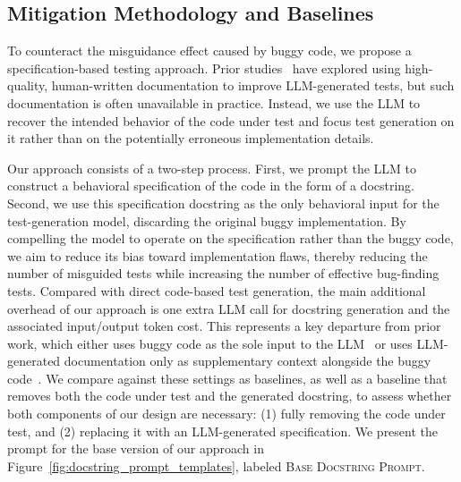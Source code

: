 \documentclass[acmsmall]{acmart}
\begin{document}
\subsection{Mitigation Methodology and Baselines}
\label{subsec:2.5_methodology}
To counteract the misguidance effect caused by buggy code, we propose a specification-based testing approach. Prior studies~\cite{huang2025measuringinfluenceincorrectcode, EmpEvalforLLMUTAutoGenTSE, trickybug} have explored using high-quality, human-written documentation to improve LLM-generated tests, but such documentation is often unavailable in practice. Instead, we use the LLM to recover the intended behavior of the code under test and focus test generation on it rather than on the potentially erroneous implementation details.

Our approach consists of a two-step process. First, we prompt the LLM to construct a behavioral specification of the code in the form of a docstring. Second, we use this specification docstring as the only behavioral input for the test-generation model, discarding the original buggy implementation. By compelling the model to operate on the specification rather than the buggy code, we aim to reduce its bias toward implementation flaws, thereby reducing the number of misguided tests while increasing the number of effective bug-finding tests. Compared with direct code-based test generation, the main additional overhead of our approach is one extra LLM call for docstring generation and the associated input/output token cost. This represents a key departure from prior work, which either uses buggy code as the sole input to the LLM~\cite{EmpEvalforLLMUTAutoGenTSE, ChatUniTestFSE2024Demo, CODAMOSAICSE2023} or uses LLM-generated documentation only as supplementary context alongside the buggy code~\cite{EvalImprChatgptUTGenFSE2024}. We compare against these settings as baselines, as well as a baseline that removes both the code under test and the generated docstring, to assess whether both components of our design are necessary: (1) fully removing the code under test, and (2) replacing it with an LLM-generated specification. We present the prompt for the base version of our approach in Figure~\ref{fig:docstring_prompt_templates}, labeled \textsc{Base Docstring Prompt}.
\end{document}
